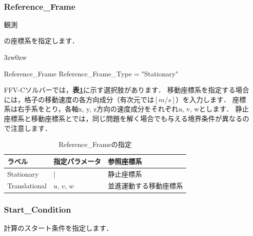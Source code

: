 \pagebreak
\mbox{ }


\pagebreak
\subsubsection{Reference\_Frame}

\hypertarget{tgt:reference_frame}{観測}の座標系を指定します．

\begin{indentation}{3zw}{0zw}
\small

\begin{program}
  Reference_Frame {
    Reference_Frame_Type = "Stationary"
  }

\end{program}

\normalsize
FFV-Cソルバーでは，\textbf{表\ref{tbl:ref_frame}}に示す選択肢があります．
移動座標系を指定する場合には，格子の移動速度の各方向成分（有次元では$[m/s]$）を入力します．
座標系は右手系をとり，各軸x, y, z方向の速度成分をそれぞれu, v, wとします．
静止座標系と移動座標系とでは，同じ問題を解く場合でも与える境界条件が異なるので注意します．

\begin{table}[htdp]
\caption{Reference\_Frameの指定}
\begin{center}
\small
\begin{tabular}{lll} \toprule
ラベル & 指定パラメータ & 参照座標系\\ \midrule
Stationary & | & 静止座標系\\
Translational & $u,\,v,\,w$ & 並進運動する移動座標系\\ \bottomrule
\end{tabular}
\end{center}
\label{tbl:ref_frame}
\end{table}

\end{indentation}



\pagebreak
\subsubsection{Start\_Condition}

計算の\hypertarget{tgt:start_condition}{スタート条件}を指定します．

